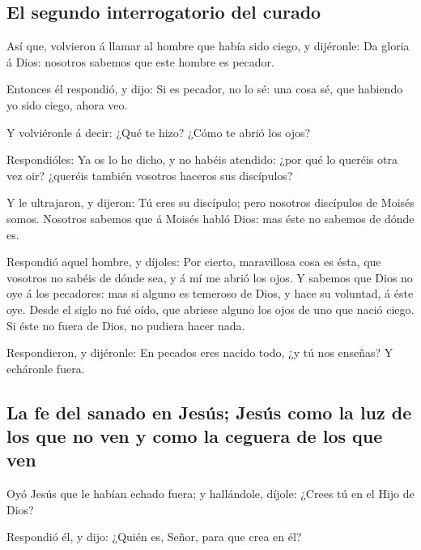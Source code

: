 \hypertarget{el-segundo-interrogatorio-del-curado}{%
\subsection{El segundo interrogatorio del
curado}\label{el-segundo-interrogatorio-del-curado}}

 Así que, volvieron á llamar al hombre que había sido
ciego, y dijéronle: Da gloria á Dios: nosotros sabemos que este hombre
es pecador.

 Entonces él respondió, y dijo: Si es pecador, no lo sé:
una cosa sé, que habiendo yo sido ciego, ahora veo.

 Y volviéronle á decir: ¿Qué te hizo? ¿Cómo te abrió los
ojos?

 Respondióles: Ya os lo he dicho, y no habéis atendido:
¿por qué lo queréis otra vez oir? ¿queréis también vosotros haceros sus
discípulos?

 Y le ultrajaron, y dijeron: Tú eres su discípulo; pero
nosotros discípulos de Moisés somos.  Nosotros sabemos
que á Moisés habló Dios: mas éste no sabemos de dónde es.

 Respondió aquel hombre, y díjoles: Por cierto,
maravillosa cosa es ésta, que vosotros no sabéis de dónde sea, y á mí me
abrió los ojos.  Y sabemos que Dios no oye á los
pecadores: mas si alguno es temeroso de Dios, y hace su voluntad, á éste
oye.  Desde el siglo no fué oído, que abriese alguno los
ojos de uno que nació ciego.  Si éste no fuera de Dios,
no pudiera hacer nada.

 Respondieron, y dijéronle: En pecados eres nacido todo,
¿y tú nos enseñas? Y echáronle fuera.

\hypertarget{la-fe-del-sanado-en-jesuxfas-jesuxfas-como-la-luz-de-los-que-no-ven-y-como-la-ceguera-de-los-que-ven}{%
\subsection{La fe del sanado en Jesús; Jesús como la luz de los que no
ven y como la ceguera de los que
ven}\label{la-fe-del-sanado-en-jesuxfas-jesuxfas-como-la-luz-de-los-que-no-ven-y-como-la-ceguera-de-los-que-ven}}

 Oyó Jesús que le habían echado fuera; y hallándole,
díjole: ¿Crees tú en el Hijo de Dios?

 Respondió él, y dijo: ¿Quién es, Señor, para que crea en
él?

